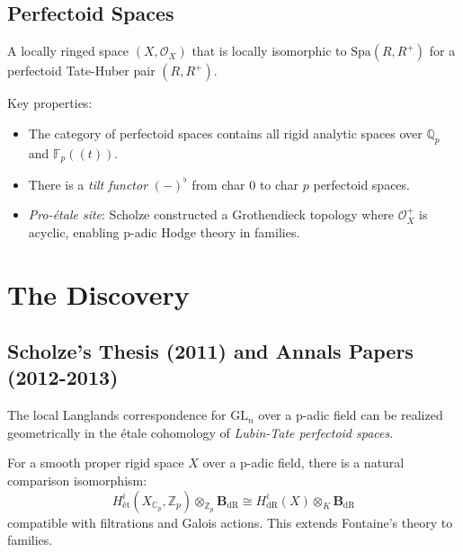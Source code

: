 \subsection{Perfectoid Spaces}
\begin{definition}
A locally ringed space $(X, \mathcal{O}_X)$ that is locally isomorphic to $\text{Spa}(R, R^+)$ for a perfectoid Tate-Huber pair $(R, R^+)$.
\end{definition}

Key properties:
\begin{itemize}
\item The category of perfectoid spaces contains all rigid analytic spaces over $\mathbb{Q}_p$ and $\mathbb{F}_p((t))$.
\item There is a \emph{tilt functor} $(-)^{\flat}$ from char $0$ to char $p$ perfectoid spaces.
\item \emph{Pro-\'etale site}: Scholze constructed a Grothendieck topology where $\mathcal{O}_X^+$ is acyclic, enabling p-adic Hodge theory in families.
\end{itemize}

\section{The Discovery}

\subsection{Scholze's Thesis (2011) and Annals Papers (2012-2013)}

\begin{theorem}
The local Langlands correspondence for $\text{GL}_n$ over a p-adic field can be realized geometrically in the \'etale cohomology of \emph{Lubin-Tate perfectoid spaces}.
\end{theorem}

\begin{theorem}
For a smooth proper rigid space $X$ over a p-adic field, there is a natural comparison isomorphism:
\[
H^i_{\text{\'et}}(X_{\mathbb{C}_p}, \mathbb{Z}_p) \otimes_{\mathbb{Z}_p} \mathbf{B}_{\text{dR}} \cong H^i_{\text{dR}}(X) \otimes_K \mathbf{B}_{\text{dR}}
\]
compatible with filtrations and Galois actions. This extends Fontaine's theory to families.
\end{theorem}

